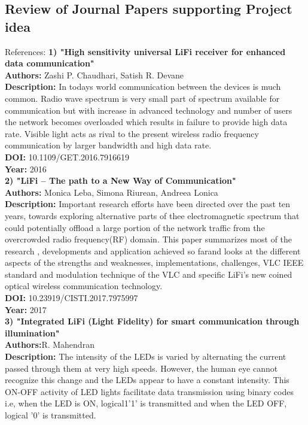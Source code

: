 \documentclass[12pt,a4paper]
{article}
\numberwithin{table}{section}
\begin{document}
{\subsection{Review of Journal Papers supporting Project idea}
{\small
References: 
\newline \textbf{ 1) "High sensitivity universal LiFi receiver for enhanced data communication"}\\
\textbf{Authors:} Zashi P. Chaudhari, Satish R. Devane\\
\textbf{Description: }In todays world communication between the devices is much common. Radio wave spectrum is very small part of spectrum available for communication but with increase in advanced technology and number of users the network becomes overloaded which results in failure to provide high data rate. Visible light acts as rival to the present wireless radio frequency communication by larger bandwidth and high data rate.\\
\textbf{DOI: }10.1109/GET.2016.7916619\\
\textbf{Year: }2016\\
\newline \textbf{ 2) "LiFi – The path to a New Way of Communication"}\\
\textbf{Authors:} Monica Leba, Simona Riurean, Andreea Lonica\\
\textbf{Description: }Important research efforts have been directed over the past ten years, towards exploring alternative parts of thee electromagnetic spectrum that could potentially offload a large portion of the network traffic from the overcrowded radio frequency(RF) domain. This paper summarizes most of the research , developments and application achieved so farand looks at the different aspects of the strengths and weaknesses, implementations, challenges, VLC IEEE standard and modulation technique of the VLC and specific LiFi's new coined optical wireless communication technology.\\
\textbf{DOI: }10.23919/CISTI.2017.7975997\\
\textbf{Year: }2017\\
\newline \textbf{3)  "Integrated LiFi (Light Fidelity) for smart communication through illumination"}\\
\textbf{Authors:}R. Mahendran\\
\textbf{Description: }The intensity of the LEDs is varied by  alternating the current passed through them at very high speeds. However, the human eye cannot recognize this change and the LEDs appear to have a constant intensity. This ON-OFF activity of LED lights facilitate data transmission using binary codes i.e, when the LED is ON, logical1'1' is transmitted and when the LED OFF, logical '0' is transmitted.\\ 
}}
\end{document}
